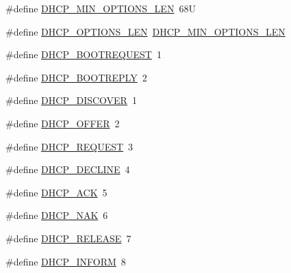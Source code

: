 \begin{DoxyCompactItemize}
\item 
\#define \hyperlink{openmote-cc2538_2lwip_2src_2include_2lwip_2prot_2dhcp_8h_a639e682d86ae2abca54841cf2d5c7b57}{D\+H\+C\+P\+\_\+\+M\+I\+N\+\_\+\+O\+P\+T\+I\+O\+N\+S\+\_\+\+L\+EN}~68U
\item 
\#define \hyperlink{openmote-cc2538_2lwip_2src_2include_2lwip_2prot_2dhcp_8h_ae99d4be0d03f6f9c8f02f63abde91a06}{D\+H\+C\+P\+\_\+\+O\+P\+T\+I\+O\+N\+S\+\_\+\+L\+EN}~\hyperlink{openmote-cc2538_2lwip_2src_2include_2lwip_2prot_2dhcp_8h_a639e682d86ae2abca54841cf2d5c7b57}{D\+H\+C\+P\+\_\+\+M\+I\+N\+\_\+\+O\+P\+T\+I\+O\+N\+S\+\_\+\+L\+EN}
\item 
\#define \hyperlink{openmote-cc2538_2lwip_2src_2include_2lwip_2prot_2dhcp_8h_a752b1eb7aba89801f20202b074f03b67}{D\+H\+C\+P\+\_\+\+B\+O\+O\+T\+R\+E\+Q\+U\+E\+ST}~1
\item 
\#define \hyperlink{openmote-cc2538_2lwip_2src_2include_2lwip_2prot_2dhcp_8h_a17ef000d25276ab6ca9d773af0d97d21}{D\+H\+C\+P\+\_\+\+B\+O\+O\+T\+R\+E\+P\+LY}~2
\item 
\#define \hyperlink{openmote-cc2538_2lwip_2src_2include_2lwip_2prot_2dhcp_8h_a368aca81d0a71853aa3939f546cc25ae}{D\+H\+C\+P\+\_\+\+D\+I\+S\+C\+O\+V\+ER}~1
\item 
\#define \hyperlink{openmote-cc2538_2lwip_2src_2include_2lwip_2prot_2dhcp_8h_a4649df4abbae20e28fe422d09decd450}{D\+H\+C\+P\+\_\+\+O\+F\+F\+ER}~2
\item 
\#define \hyperlink{openmote-cc2538_2lwip_2src_2include_2lwip_2prot_2dhcp_8h_a98a346c53c91848070fd980a98fa77d1}{D\+H\+C\+P\+\_\+\+R\+E\+Q\+U\+E\+ST}~3
\item 
\#define \hyperlink{openmote-cc2538_2lwip_2src_2include_2lwip_2prot_2dhcp_8h_ae7469660afdf7997c020f7fbf5164548}{D\+H\+C\+P\+\_\+\+D\+E\+C\+L\+I\+NE}~4
\item 
\#define \hyperlink{openmote-cc2538_2lwip_2src_2include_2lwip_2prot_2dhcp_8h_a3cca70105d2c42c3381829f456446e0e}{D\+H\+C\+P\+\_\+\+A\+CK}~5
\item 
\#define \hyperlink{openmote-cc2538_2lwip_2src_2include_2lwip_2prot_2dhcp_8h_a12682fd5edb10129309f2046504d4221}{D\+H\+C\+P\+\_\+\+N\+AK}~6
\item 
\#define \hyperlink{openmote-cc2538_2lwip_2src_2include_2lwip_2prot_2dhcp_8h_ae629d2dc5df40f03ea87cc94a5e3f3eb}{D\+H\+C\+P\+\_\+\+R\+E\+L\+E\+A\+SE}~7
\item 
\#define \hyperlink{openmote-cc2538_2lwip_2src_2include_2lwip_2prot_2dhcp_8h_aaea6a969c0da81c2611885514bbe433f}{D\+H\+C\+P\+\_\+\+I\+N\+F\+O\+RM}~8
\item 

\end{DoxyCompactItemize}
